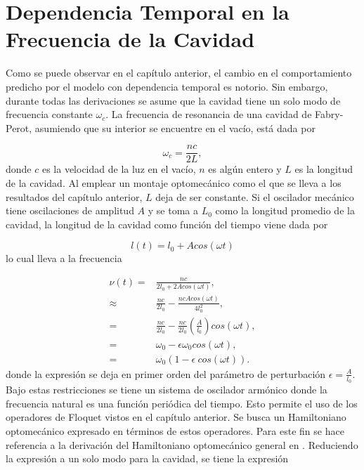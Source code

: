\documentclass[10pt,a4paper]{report}
\begin{document}
\chapter{Dependencia Temporal en la Frecuencia de la Cavidad}

Como se puede observar en el capítulo anterior, el cambio en el comportamiento predicho por el modelo con dependencia temporal es notorio. Sin embargo, durante todas las derivaciones se asume que la cavidad tiene un solo modo de frecuencia constante $\omega_c$. La frecuencia de resonancia de una cavidad de Fabry-Perot, asumiendo que su interior se encuentre en el vacío, está dada por

\begin{equation}
\omega_c = \frac{nc}{2L},
\end{equation} donde $c$ es la velocidad de la luz en el vacío, $n$ es algún entero y $L$ es la longitud de la cavidad. Al emplear un montaje optomecánico como el que se lleva a los resultados del capítulo anterior, $L$ deja de ser constante. Si el oscilador mecánico tiene oscilaciones de amplitud $A$ y se toma a $L_0$ como la longitud promedio de la cavidad, la longitud de la cavidad como función del tiempo viene dada por

\begin{equation}
l(t) = l_0 + A cos(\omega t)
\end{equation} lo cual lleva a la frecuencia 

\begin{align}
\nu(t) =& \frac{nc}{2l_0+2Acos(\omega t)}, \\
\approx& \frac{nc}{2l_0} - \frac{nc Acos(\omega t)}{4l_0^2}, \\
=& \frac{nc}{2l_0} - \frac{nc}{2l_0}(\frac{A}{l_0})cos(\omega t), \\
=& \omega_0 - \epsilon\omega_0 cos(\omega t), \\
=& \omega_0(1-\epsilon\ cos(\omega t)).
\end{align} donde la expresión se deja en primer orden del parámetro de perturbación $\epsilon = \frac{A}{l_0}$. Bajo estas restricciones se tiene un sistema de oscilador armónico donde la frecuencia natural es una función periódica del tiempo. Esto permite el uso de los operadores de Floquet vistos en el capítulo anterior. Se busca un Hamiltoniano optomecánico expresado en términos de estos operadores. Para este fin se hace referencia a la derivación del Hamiltoniano optomecánico general en \cite{LawOH}. Reduciendo la expresión a un solo modo para la cavidad, se tiene la expresión
\end{document}
